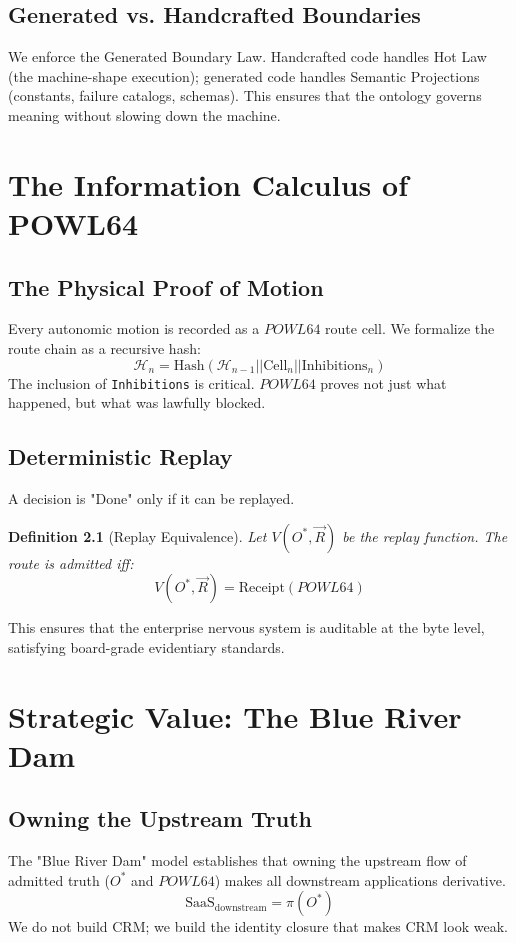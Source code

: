 \documentclass[12pt,a4paper,oneside]{book}
\newtheorem{definition}{Definition}[chapter]
\begin{document}
\section{Generated vs. Handcrafted Boundaries}
We enforce the Generated Boundary Law. Handcrafted code handles Hot Law (the machine-shape execution); generated code handles Semantic Projections (constants, failure catalogs, schemas). This ensures that the ontology governs meaning without slowing down the machine.

\chapter{The Information Calculus of POWL64}

\section{The Physical Proof of Motion}
Every autonomic motion is recorded as a $POWL64$ route cell. We formalize the route chain as a recursive hash:
\begin{equation}
\mathcal{H}_n = \text{Hash}(\mathcal{H}_{n-1} || \text{Cell}_n || \text{Inhibitions}_n)
\end{equation}
The inclusion of \texttt{Inhibitions} is critical. $POWL64$ proves not just what happened, but what was lawfully blocked.

\section{Deterministic Replay}
A decision is "Done" only if it can be replayed.
\begin{definition}[Replay Equivalence]
Let $V(O^*, \vec{R})$ be the replay function. The route is admitted iff:
\begin{equation}
V(O^*, \vec{R}) = \text{Receipt}(POWL64)
\end{equation}
\end{definition}
This ensures that the enterprise nervous system is auditable at the byte level, satisfying board-grade evidentiary standards.

\chapter{Strategic Value: The Blue River Dam}

\section{Owning the Upstream Truth}
The "Blue River Dam" model establishes that owning the upstream flow of admitted truth ($O^*$ and $POWL64$) makes all downstream applications derivative.
\begin{equation}
\text{SaaS}_{\text{downstream}} = \pi(O^*)
\end{equation}
We do not build CRM; we build the identity closure that makes CRM look weak.
\end{document}

